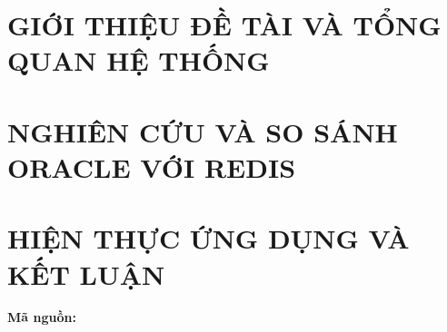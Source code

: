 {\fontsize{12}{15}\selectfont\tableofcontents\par}
\clearpage
\fontsize{13}{18}\selectfont


\clearpage
\section{GIỚI THIỆU ĐỀ TÀI VÀ TỔNG QUAN HỆ THỐNG}\label{sec:introduction}
\begingroup
{}
\fontsize{12}{16}\selectfont


\par
\endgroup

\clearpage
\section{NGHIÊN CỨU VÀ SO SÁNH ORACLE VỚI REDIS}\label{sec:research}







\clearpage
\section{HIỆN THỰC ỨNG DỤNG VÀ KẾT LUẬN}\label{sec:implementation}
\begingroup
{}
\fontsize{12}{16}\selectfont
{}

\par
\endgroup

\bigskip
\noindent\textbf{Mã nguồn:} \href{\repourl}{\textcolor{RepoLink}{\textbf{\texttt{\repourl}}}}

\ifreportcitations
  \clearpage
  \printbibliography[heading=bibintoc,title={Tài liệu tham khảo}]
\fi
\label{LastPage}

